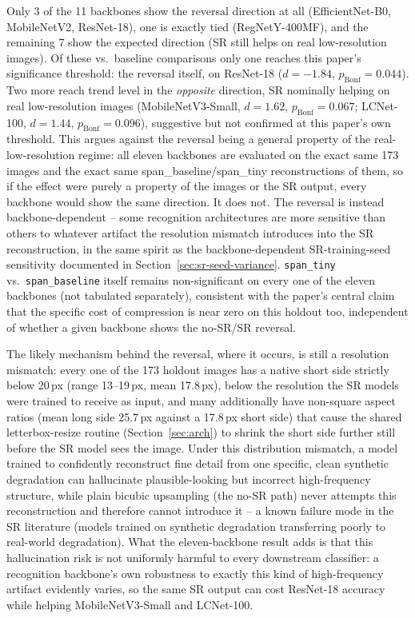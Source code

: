 \documentclass[11pt]{article}
\begin{document}
Only 3 of the 11 backbones show the reversal direction at all (EfficientNet-B0, MobileNetV2, ResNet-18), one is exactly tied (RegNetY-400MF), and the remaining 7 show the expected direction (SR still helps on real low-resolution images). Of these vs.\ baseline comparisons only one reaches this paper's significance threshold: the reversal itself, on ResNet-18 ($d{=}{-}1.84$, $p_{\text{Bonf}}{=}0.044$). Two more reach trend level in the \emph{opposite} direction, SR nominally helping on real low-resolution images (MobileNetV3-Small, $d{=}1.62$, $p_{\text{Bonf}}{=}0.067$; LCNet-100, $d{=}1.44$, $p_{\text{Bonf}}{=}0.096$), suggestive but not confirmed at this paper's own threshold. This argues against the reversal being a general property of the real-low-resolution regime: all eleven backbones are evaluated on the exact same 173 images and the exact same span\_baseline/span\_tiny reconstructions of them, so if the effect were purely a property of the images or the SR output, every backbone would show the same direction. It does not. The reversal is instead backbone-dependent -- some recognition architectures are more sensitive than others to whatever artifact the resolution mismatch introduces into the SR reconstruction, in the same spirit as the backbone-dependent SR-training-seed sensitivity documented in Section~\ref{sec:sr-seed-variance}. \texttt{span\_tiny} vs.\ \texttt{span\_baseline} itself remains non-significant on every one of the eleven backbones (not tabulated separately), consistent with the paper's central claim that the specific cost of compression is near zero on this holdout too, independent of whether a given backbone shows the no-SR/SR reversal.

The likely mechanism behind the reversal, where it occurs, is still a resolution mismatch: every one of the 173 holdout images has a native short side strictly below 20\,px (range 13--19\,px, mean 17.8\,px), below the resolution the SR models were trained to receive as input, and many additionally have non-square aspect ratios (mean long side 25.7\,px against a 17.8\,px short side) that cause the shared letterbox-resize routine (Section~\ref{sec:arch}) to shrink the short side further still before the SR model sees the image. Under this distribution mismatch, a model trained to confidently reconstruct fine detail from one specific, clean synthetic degradation can hallucinate plausible-looking but incorrect high-frequency structure, while plain bicubic upsampling (the no-SR path) never attempts this reconstruction and therefore cannot introduce it -- a known failure mode in the SR literature (models trained on synthetic degradation transferring poorly to real-world degradation). What the eleven-backbone result adds is that this hallucination risk is not uniformly harmful to every downstream classifier: a recognition backbone's own robustness to exactly this kind of high-frequency artifact evidently varies, so the same SR output can cost ResNet-18 accuracy while helping MobileNetV3-Small and LCNet-100.
\end{document}
